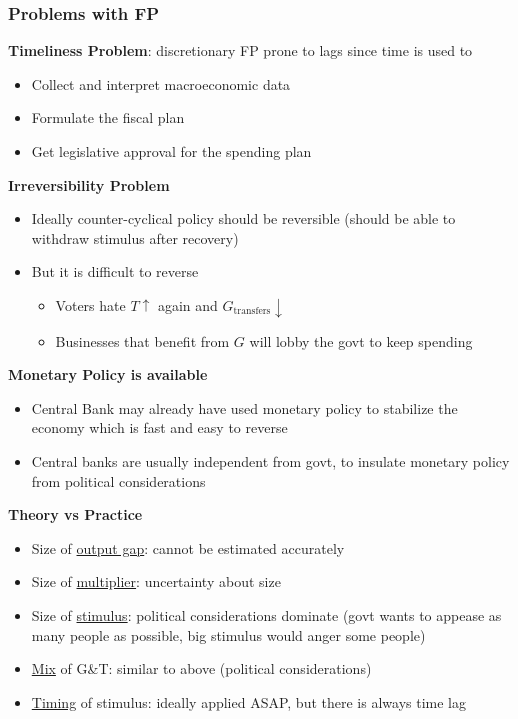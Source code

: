 \documentclass{article}
\begin{document}
\begin{multicols}{2}
\subsubsection{Problems with FP}
\textbf{Timeliness Problem}: discretionary FP prone to lags since time is used to
\begin{itemize}
	\item Collect and interpret macroeconomic data
	\item Formulate the fiscal plan
	\item Get legislative approval for the spending plan
\end{itemize}
\textbf{Irreversibility Problem}
\begin{itemize}
	\item Ideally counter-cyclical policy should be reversible (should be able to withdraw stimulus after recovery)
	\item But it is difficult to reverse
	\begin{itemize}
		\item Voters hate $T \uparrow$ again and $G_{\text{transfers}} \downarrow$
		\item Businesses that benefit from $G$ will lobby the govt to keep spending
	\end{itemize}
\end{itemize}
\textbf{Monetary Policy is available}
\begin{itemize}
	\item Central Bank may already have used monetary policy to stabilize the economy which is fast and easy to reverse
	\item Central banks are usually independent from govt, to insulate monetary policy from political considerations
\end{itemize}
\textbf{Theory vs Practice}
\begin{itemize}
	\item Size of \underline{output gap}: cannot be estimated accurately
	\item Size of \underline{multiplier}: uncertainty about size
	\item Size of \underline{stimulus}: political considerations dominate (govt wants to appease as many people as possible, big stimulus would anger some people)
	\item \underline{Mix} of G\&T: similar to above (political considerations)
	\item \underline{Timing} of stimulus: ideally applied ASAP, but there is always time lag
\end{itemize}

\end{multicols}
\end{document}
